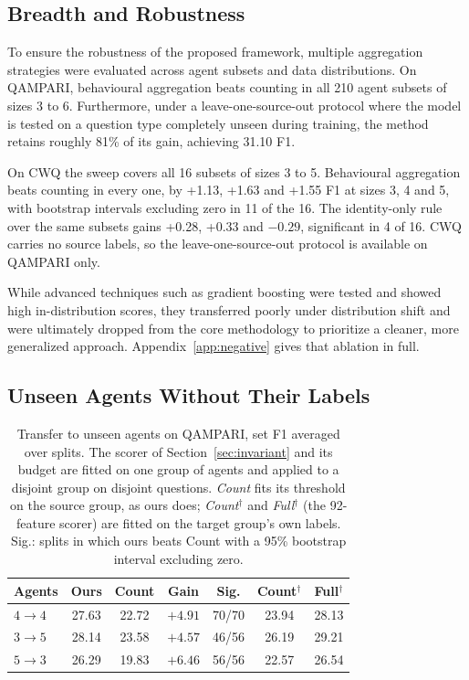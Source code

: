 \documentclass[11pt]{article}
\begin{document}

\subsection{Breadth and Robustness}
\label{sec:breadth}
\label{sec:robust}

To ensure the robustness of the proposed framework, multiple aggregation strategies were evaluated across agent subsets and data distributions. On QAMPARI, behavioural aggregation beats counting in all 210 agent subsets of sizes 3 to 6. Furthermore, under a leave-one-source-out protocol where the model is tested on a question type completely unseen during training, the method retains roughly 81\% of its gain, achieving 31.10 F1.

On CWQ the sweep covers all 16 subsets of sizes 3 to 5. Behavioural aggregation beats counting in every one, by +1.13, +1.63 and +1.55 F1 at sizes 3, 4 and 5, with bootstrap intervals excluding zero in 11 of the 16. The identity-only rule over the same subsets gains +0.28, +0.33 and $-0.29$, significant in 4 of 16. CWQ carries no source labels, so the leave-one-source-out protocol is available on QAMPARI only.

While advanced techniques such as gradient boosting were tested and showed high in-distribution scores, they transferred poorly under distribution shift and were ultimately dropped from the core methodology to prioritize a cleaner, more generalized approach. Appendix~\ref{app:negative} gives that ablation in full.

\subsection{Unseen Agents Without Their Labels}
\label{sec:transfer}

\begin{table}[t]
\centering
\small
\setlength{\tabcolsep}{4pt}
\caption{Transfer to unseen agents on QAMPARI, set F1 averaged over splits. The scorer of Section~\ref{sec:invariant} and its budget are fitted on one group of agents and applied to a disjoint group on disjoint questions. \emph{Count} fits its threshold on the source group, as ours does; \emph{Count$^\dagger$} and \emph{Full$^\dagger$} (the 92-feature scorer) are fitted on the target group's own labels. Sig.: splits in which ours beats Count with a 95\% bootstrap interval excluding zero.}
\label{tab:transfer}
\begin{tabular}{lcccccc}
\toprule
Agents & Ours & Count & Gain & Sig. & Count$^\dagger$ & Full$^\dagger$ \\
\midrule
$4 \to 4$ & 27.63 & 22.72 & $+4.91$ & 70/70 & 23.94 & 28.13 \\
$3 \to 5$ & 28.14 & 23.58 & $+4.57$ & 46/56 & 26.19 & 29.21 \\
$5 \to 3$ & 26.29 & 19.83 & $+6.46$ & 56/56 & 22.57 & 26.54 \\
\bottomrule
\end{tabular}
\end{table}
\end{document}
